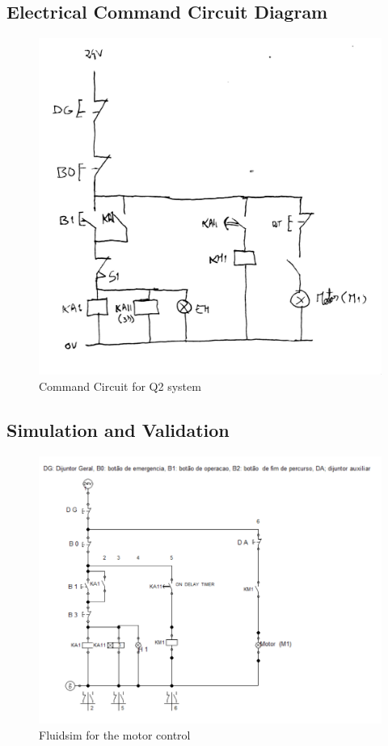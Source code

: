 \subsection{Electrical Command Circuit Diagram} \label{sec:Electrical_Command_Circuit_Diagram}

\begin{figure}[H]
    \includegraphics[width=16cm]{Images/Q2/Q2_command.jpeg}
    \centering
    \caption{Command Circuit for Q2 system}
    \label{fig:Q2_command}
\end{figure}

\subsection{Simulation and Validation} \label{sec:Simulation_and_Validation}

\begin{figure}[H]
    \includegraphics[width=16cm]{Images/Q2/fluidsim.png}
    \centering
    \caption{Fluidsim for the motor control}
    \label{fig:fluidsim}
\end{figure}


